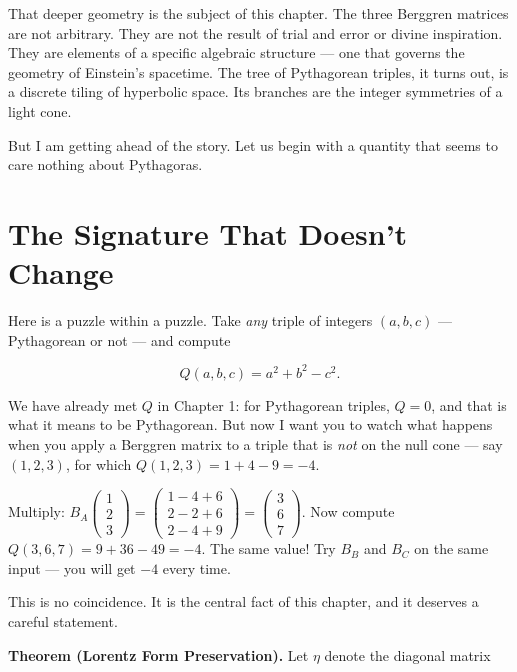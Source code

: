 That deeper geometry is the subject of this chapter. The three Berggren matrices are not arbitrary. They are not the result of trial and error or divine inspiration. They are elements of a specific algebraic structure --- one that governs the geometry of Einstein's spacetime. The tree of Pythagorean triples, it turns out, is a discrete tiling of hyperbolic space. Its branches are the integer symmetries of a light cone.

But I am getting ahead of the story. Let us begin with a quantity that seems to care nothing about Pythagoras.


\bigskip


\section{The Signature That Doesn't Change}

Here is a puzzle within a puzzle. Take \textit{any} triple of integers $(a, b, c)$ --- Pythagorean or not --- and compute

\[
Q(a, b, c) = a^2 + b^2 - c^2.
\]

We have already met $Q$ in Chapter 1: for Pythagorean triples, $Q = 0$, and that is what it means to be Pythagorean. But now I want you to watch what happens when you apply a Berggren matrix to a triple that is \textit{not} on the null cone --- say $(1, 2, 3)$, for which $Q(1, 2, 3) = 1 + 4 - 9 = -4$.

Multiply: $B_A \begin{pmatrix} 1 \\ 2 \\ 3 \end{pmatrix} = \begin{pmatrix} 1 - 4 + 6 \\ 2 - 2 + 6 \\ 2 - 4 + 9 \end{pmatrix} = \begin{pmatrix} 3 \\ 6 \\ 7 \end{pmatrix}.$ Now compute $Q(3, 6, 7) = 9 + 36 - 49 = -4.$ The same value! Try $B_B$ and $B_C$ on the same input --- you will get $-4$ every time.

This is no coincidence. It is the central fact of this chapter, and it deserves a careful statement.

\textbf{Theorem (Lorentz Form Preservation).} Let $\eta$ denote the diagonal matrix

